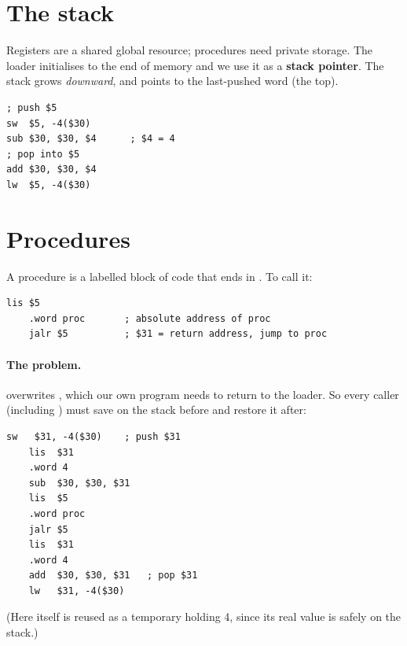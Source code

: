 \section{The stack}

Registers are a shared global resource; procedures need private storage. The loader
initialises  to the end of memory and we use it as a \textbf{stack pointer}. The
stack grows \emph{downward}, and  points to the last-pushed word (the top).

\begin{lstlisting}[style=mips]
; push $5
sw  $5, -4($30)
sub $30, $30, $4      ; $4 = 4
; pop into $5
add $30, $30, $4
lw  $5, -4($30)
\end{lstlisting}

\begin{center}
\end{center}

\section{Procedures}

A procedure is a labelled block of code that ends in . To call it:
\begin{lstlisting}[style=mips]
    lis $5
    .word proc       ; absolute address of proc
    jalr $5          ; $31 = return address, jump to proc
\end{lstlisting}

\paragraph{The  problem.}  overwrites , which our own
program needs to return to the loader. So every caller (including ) must save
 on the stack before  and restore it after:
\begin{lstlisting}[style=mips]
    sw   $31, -4($30)    ; push $31
    lis  $31
    .word 4
    sub  $30, $30, $31
    lis  $5
    .word proc
    jalr $5
    lis  $31
    .word 4
    add  $30, $30, $31   ; pop $31
    lw   $31, -4($30)
\end{lstlisting}
(Here  itself is reused as a temporary holding 4, since its real value is safely
on the stack.)

